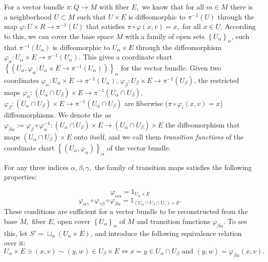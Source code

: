 \documentclass[12pt, letterpaper, reqno]{amsart}
\theoremstyle{definition}
\theoremstyle{plain}
\theoremstyle{remark}
\begin{document}
For a vector bundle $ \pi: Q \rightarrow M $ with fiber $ E,  $ we know that for all $ m\in M $ there is a neighborhood $ U\subset M $ such that $ U\times E $ is diffeomorphic to $ \pi^{-1}(U) $ through the map $ \varphi: U\times R \rightarrow \pi^{-1}(U) $ that satisfies $ \pi\circ\varphi(x,v)=x, $ for all $ x\in U. $ According to this, we can cover the base space $ M $ with a family of open sets $ \left\{ U_\alpha \right\}_\alpha $, such that $ \pi^{-1}(U_\alpha) $ is diffeomorphic to $ U_\alpha\times E $ through the diffeomorphism $ \varphi_\alpha : U_\alpha\times E \rightarrow \pi^{-1}(U_\alpha) $. This gives a coordinate chart $ \left\{(U_\alpha, \varphi_\alpha: U_\alpha\times E \rightarrow \pi^{-1}(U_\alpha) )\right\}_\alpha  $ for the vector bundle. Given two coordinates  $ \varphi_\alpha: U_\alpha\times E \rightarrow \pi^{-1}(U_\alpha) $, $ \varphi_\beta: U_\beta\times E \rightarrow \pi^{-1}(U_\beta) $, the restricted maps $ \varphi_\alpha: (U_\alpha\cap U_\beta)\times E \rightarrow \pi^{-1}(U_\alpha\cap U_\beta) $, $ \varphi_\beta: (U_\alpha\cap U_\beta)\times E \rightarrow \pi^{-1}(U_\alpha\cap U_\beta) $ are fiberwise ($\pi\circ\varphi_i(x,v)=x$) diffeomorphisms. We denote the as $ \varphi_{\beta\alpha}:=\varphi_\beta\circ\varphi_\alpha^{-1}:(U_\alpha\cap U_\beta)\times E \rightarrow (U_\alpha\cap U_\beta)\times E $ the diffeomorphism that maps $ (U_\alpha\cap U_\beta)\times E $ onto itself, and we call them \textit{transition functions} of the coordinate chart $ \left\{ (U_\alpha,\varphi_\alpha) \right\}_\alpha  $ of the vector bundle.

For any three indices $ \alpha,\beta,\gamma, $ the family of transition maps satisfies the following properties:

\begin{equation}\label{eq:fvb}
	\varphi_{\alpha\alpha} = 1_{U_\alpha\times E}
\end{equation}
\begin{equation}\label{eq:svb}
	\varphi_{\alpha\gamma}\circ\varphi_{\gamma\beta}\circ\varphi_{\beta\alpha} = 1_{(U_\alpha\cap U_\beta\cap U_\gamma)\times E}.
\end{equation}
These conditions are sufficient for a vector bundle to be reconstructed from the base $ M, $ fiber $ E $, open cover $ \left\{ U_\alpha \right\}_\alpha  $ of $ M $ and transition functions $ \varphi_{\beta\alpha}. $ To see this, let $ S'=\sqcup_\alpha (U_\alpha\times E) $, and introduce the following equivalence relation over it:
$$ U_\alpha\times E\ni(x,v)\sim (y,w)\in U_\beta\times E \iff x=y\in U_\alpha\cap U_\beta \text{ and } (y,w)=\varphi_{\beta\alpha}(x,v). $$ 
\end{document}
